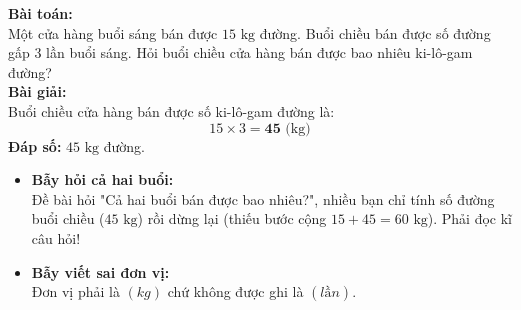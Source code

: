 \documentclass[12pt,a4paper]{article}
\begin{document}
\vspace{-2.5mm}
\noindent
\begin{minipage}[t]{0.49\textwidth}\vspace{0pt}
\begin{tcolorbox}[
  enhanced,
  colback=green!4!white,
  colframe=green!60!black,
  arc=2mm, boxrule=0.8pt,
  left=2mm, right=2mm, top=1.8mm, bottom=1.8mm,
  title={\footnotesize\bfseries\color{white}\faCheckCircle\ Ví dụ thực hành chuẩn mực}
]
{\footnotesize
\textbf{Bài toán:}\\
Một cửa hàng buổi sáng bán được $15\text{ kg}$ đường. Buổi chiều bán được số đường gấp $3$ lần buổi sáng. Hỏi buổi chiều cửa hàng bán được bao nhiêu ki-lô-gam đường?\\
\textbf{Bài giải:}\\
Buổi chiều cửa hàng bán được số ki-lô-gam đường là:
$$15 \times 3 = \mathbf{45}\text{ (kg)}$$
\textbf{Đáp số:} $45\text{ kg}$ đường.
}
\end{tcolorbox}
\end{minipage}
\hfill
\begin{minipage}[t]{0.49\textwidth}\vspace{0pt}
\begin{tcolorbox}[
  enhanced,
  colback=red!4!white,
  colframe=red!70!black,
  arc=2mm, boxrule=0.8pt,
  left=2mm, right=2mm, top=1.8mm, bottom=1.8mm,
  title={\footnotesize\bfseries\color{white}\faExclamationTriangle\ Mẹo tránh bẫy trắc nghiệm}
]
{\footnotesize
\begin{itemize}\setlength{\itemsep}{1.5pt}\setlength{\leftskip}{-2.5mm}
  \item \textbf{Bẫy hỏi cả hai buổi:}\\
  Đề bài hỏi "Cả hai buổi bán được bao nhiêu?", nhiều bạn chỉ tính số đường buổi chiều ($45\text{ kg}$) rồi dừng lại (thiếu bước cộng $15 + 45 = 60\text{ kg}$). Phải đọc kĩ câu hỏi!
  \item \textbf{Bẫy viết sai đơn vị:}\\
  Đơn vị phải là $(kg)$ chứ không được ghi là $(lần)$.
\end{itemize}
}
\end{tcolorbox}
\end{minipage}
\end{document}
